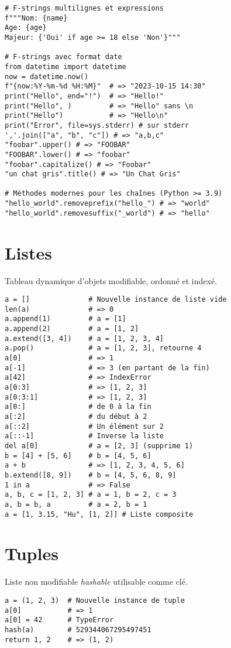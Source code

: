 \documentclass{article}
\begin{document}
\begin{multicols*}{4}
\begin{lstlisting}
# F-strings multilignes et expressions
f"""Nom: {name}
Age: {age}
Majeur: {'Oui' if age >= 18 else 'Non'}"""

# F-strings avec format date
from datetime import datetime
now = datetime.now()
f"{now:%Y-%m-%d %H:%M}"  # => "2023-10-15 14:30"
print("Hello", end="!")  # => "Hello!"
print("Hello", )         # => "Hello" sans \n
print("Hello")           # => "Hello\n"
print("Error", file=sys.stderr) # sur stderr
','.join(["a", "b", "c"]) # => "a,b,c"
"foobar".upper() # => "FOOBAR"
"FOOBAR".lower() # => "foobar"
"foobar".capitalize() # => "Foobar"
"un chat gris".title() # => "Un Chat Gris"

# Méthodes modernes pour les chaînes (Python >= 3.9)
"hello_world".removeprefix("hello_") # => "world"
"hello_world".removesuffix("_world") # => "hello"
\end{lstlisting}

\section*{Listes}
Tableau dynamique d'objets modifiable, ordonné et indexé.
\begin{lstlisting}
a = []              # Nouvelle instance de liste vide
len(a)              # => 0
a.append(1)         # a = [1]
a.append(2)         # a = [1, 2]
a.extend([3, 4])    # a = [1, 2, 3, 4]
a.pop()             # a = [1, 2, 3], retourne 4
a[0]                # => 1
a[-1]               # => 3 (en partant de la fin)
a[42]               # => IndexError
a[0:3]              # => [1, 2, 3]
a[0:3:1]            # => [1, 2, 3]
a[0:]               # de 0 à la fin
a[:2]               # du début à 2
a[::2]              # Un élément sur 2
a[::-1]             # Inverse la liste
del a[0]            # a = [2, 3] (supprime 1)
b = [4] + [5, 6]    # b = [4, 5, 6]
a + b               # => [1, 2, 3, 4, 5, 6]
b.extend([8, 9])    # b = [4, 5, 6, 8, 9]
1 in a              # => False
a, b, c = [1, 2, 3] # a = 1, b = 2, c = 3
a, b = b, a         # a = 2, b = 1
a = [1, 3.15, "Hu", [1, 2]] # Liste composite
\end{lstlisting}

\section*{Tuples}
Liste non modifiable \emph{hashable} utilisable comme clé.
\begin{lstlisting}
a = (1, 2, 3)  # Nouvelle instance de tuple
a[0]           # => 1
a[0] = 42      # TypeError
hash(a)        # 529344067295497451
return 1, 2    # => (1, 2)
\end{lstlisting}


\end{multicols*}
\end{document}
